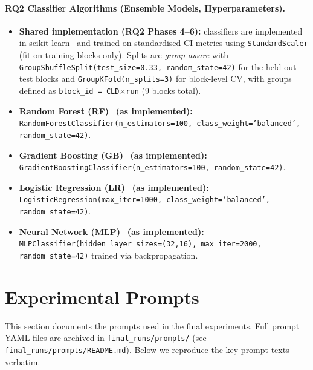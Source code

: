 \subsubsection{RQ2 Classifier Algorithms (Ensemble Models, Hyperparameters).}
\label{sec:rq2_classifier_notes}
\begin{itemize}[noitemsep]
    \item \textbf{Shared implementation (RQ2 Phases 4--6):} classifiers are implemented in scikit-learn~\cite{pedregosa2011sklearn} and trained on standardised CI metrics using \texttt{StandardScaler} (fit on training blocks only). Splits are \emph{group-aware} with \texttt{GroupShuffleSplit(test\_size=0.33, random\_state=42)} for the held-out test blocks and \texttt{GroupKFold(n\_splits=3)} for block-level CV, with groups defined as \texttt{block\_id = CLD$\times$run} (9 blocks total).
    \item \textbf{Random Forest (RF)}~\cite{breiman2001random} \textbf{(as implemented):} {\small\texttt{RandomForestClassifier(\allowbreak n\_estimators=100, class\_weight='balanced', random\_state=42)}}.
    \item \textbf{Gradient Boosting (GB)}~\cite{friedman2001greedy} \textbf{(as implemented):} {\small\texttt{GradientBoostingClassifier(\allowbreak n\_estimators=100, random\_state=42)}}.
    \item \textbf{Logistic Regression (LR)}~\cite{abd18569-0124-3b1e-9ca9-67a6fd857a26} \textbf{(as implemented):} {\small\texttt{LogisticRegression(\allowbreak max\_iter=1000, class\_weight='balanced', random\_state=42)}}.
    \item \textbf{Neural Network (MLP)}~\cite{rumelhart1986learning} \textbf{(as implemented):} {\small\texttt{MLPClassifier(\allowbreak hidden\_layer\_sizes=(32,16), max\_iter=2000, random\_state=42)}} trained via backpropagation.
\end{itemize}


\chapter{Experimental Prompts}
\label{sec:appendix_prompts}

This section documents the prompts used in the final experiments. Full prompt YAML files are archived in \texttt{final\_runs/prompts/} (see \texttt{final\_runs/prompts/README.md}). Below we reproduce the key prompt texts verbatim.

